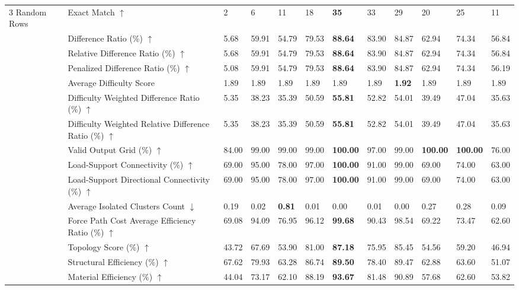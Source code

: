 \begin{table}[!h]
{\begin{tabular}{llllllllllll}
3 Random Rows & Exact Match $\uparrow$ & 2 & 6 & 11 & 18 & \textbf{35} & 33 & 29 & 20 & 25 & 11 \\
 & Difference Ratio (\%) $\uparrow$ & 5.68 & 59.91 & 54.79 & 79.53 & \textbf{88.64} & 83.90 & 84.87 & 62.94 & 74.34 & 56.84 \\
 & Relative Difference Ratio (\%) $\uparrow$ & 5.68 & 59.91 & 54.79 & 79.53 & \textbf{88.64} & 83.90 & 84.87 & 62.94 & 74.34 & 56.84 \\
 & Penalized Difference Ratio (\%) $\uparrow$ & 5.08 & 59.91 & 54.79 & 79.53 & \textbf{88.64} & 83.90 & 84.87 & 62.94 & 74.34 & 56.19 \\
 & Average Difficulty Score & 1.89 & 1.89 & 1.89 & 1.89 & 1.89 & 1.89 & \textbf{1.92} & 1.89 & 1.89 & 1.89 \\
 & Difficulty Weighted Difference Ratio (\%) $\uparrow$ & 5.35 & 38.23 & 35.39 & 50.59 & \textbf{55.81} & 52.82 & 54.01 & 39.49 & 47.04 & 35.63 \\
 & Difficulty Weighted Relative Difference Ratio (\%) $\uparrow$ & 5.35 & 38.23 & 35.39 & 50.59 & \textbf{55.81} & 52.82 & 54.01 & 39.49 & 47.04 & 35.63 \\
 & Valid Output Grid (\%) $\uparrow$ & 84.00 & 99.00 & 99.00 & 99.00 & \textbf{100.00} & 97.00 & 99.00 & \textbf{100.00} & \textbf{100.00} & 76.00 \\
 & Load-Support Connectivity (\%) $\uparrow$ & 69.00 & 95.00 & 78.00 & 97.00 & \textbf{100.00} & 91.00 & 99.00 & 69.00 & 74.00 & 63.00 \\
 & Load-Support Directional Connectivity (\%) $\uparrow$ & 69.00 & 95.00 & 78.00 & 97.00 & \textbf{100.00} & 91.00 & 99.00 & 69.00 & 74.00 & 63.00 \\
 & Average Isolated Clusters Count $\downarrow$ & 0.19 & 0.02 & \textbf{0.81} & 0.01 & 0.00 & 0.01 & 0.00 & 0.27 & 0.28 & 0.09 \\
 & Force Path Cost Average Efficiency Ratio (\%) $\uparrow$ & 69.08 & 94.09 & 76.95 & 96.12 & \textbf{99.68} & 90.43 & 98.54 & 69.22 & 73.47 & 62.60 \\
 & Topology Score (\%) $\uparrow$ & 43.72 & 67.69 & 53.90 & 81.00 & \textbf{87.18} & 75.95 & 85.45 & 54.56 & 59.20 & 46.94 \\
 & Structural Efficiency (\%) $\uparrow$ & 67.62 & 79.93 & 63.28 & 86.74 & \textbf{89.50} & 78.40 & 89.47 & 62.88 & 63.60 & 51.07 \\
 & Material Efficiency (\%) $\uparrow$ & 44.04 & 73.17 & 62.10 & 88.19 & \textbf{93.67} & 81.48 & 90.89 & 57.68 & 62.60 & 53.82 \\

\end{tabular}}
\end{table}
